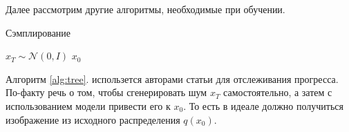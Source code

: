 \documentclass[11pt, a4paper, twocolumn, twoside]{article} %
\begin{document}
Далее рассмотрим другие алгоритмы, необходимые при обучении.
\begin{algorithm}
\caption{Сэмплирование}\label{alg:tree}
$x_T\sim\mathcal{N}(0, I)$\;
\Return $x_0$
\end{algorithm}
Алгоритм \ref{alg:tree}. использется авторами статьи \cite{Ho2020} для отслеживания прогресса. По-факту речь о том, чтобы сгенерировать шум $x_T$ самостоятельно, а затем с использованием модели привести его к $x_0$. То есть в идеале должно получиться изображение из исходного распределения $q(x_0)$. 




\end{document}
